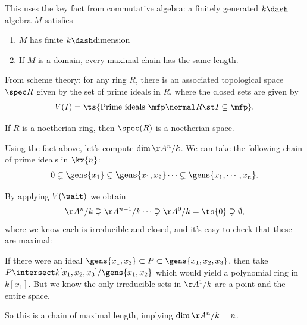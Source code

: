\begin{remark}

This uses the key fact from commutative algebra: a finitely generated
\(k\dash\)algebra \(M\) satisfies

\begin{enumerate}
\def\labelenumi{\arabic{enumi}.}
\tightlist
\item
  \(M\) has finite \(k\dash\)dimension
\item
  If \(M\) is a domain, every maximal chain has the same length.
\end{enumerate}

\end{remark}

\begin{remark}

From scheme theory: for any ring \(R\), there is an associated
topological space \(\spec R\) given by the set of prime ideals in \(R\),
where the closed sets are given by
\begin{align*}  
V(I) = \ts{\text{Prime ideals } \mfp \normal R \st I\subseteq \mfp }
.\end{align*}

If \(R\) is a noetherian ring, then \(\spec(R)\) is a noetherian space.

\end{remark}

\begin{example}

Using the fact above, let's compute \(\dim \AA^n/k\). We can take the
following chain of prime ideals in \(\kx{n}\):
\begin{align*}  
0 \subsetneq \gens{x_1} \subsetneq \gens{x_1, x_2} \cdots \subsetneq \gens{x_1, \cdots, x_n}
.\end{align*}

By applying \(V(\wait)\) we obtain
\begin{align*}  
\AA^n/k \supsetneq \AA^{n-1}/k \cdots \supsetneq \AA^0/k = \ts{0} \supsetneq \emptyset
,\end{align*} where we know each is irreducible and closed, and it's
easy to check that these are maximal:

If there were an ideal
\(\gens{x_1, x_2} \subset P \subset \gens{x_1, x_2, x_3}\), then take
\(P\intersect k[x_1, x_2, x_3] / \gens{x_1, x_2}\) which would yield a
polynomial ring in \(k[x_1]\). But we know the only irreducible sets in
\(\AA^1/k\) are a point and the entire space.

So this is a chain of maximal length, implying \(\dim \AA^n/k = n\).

\end{example}

